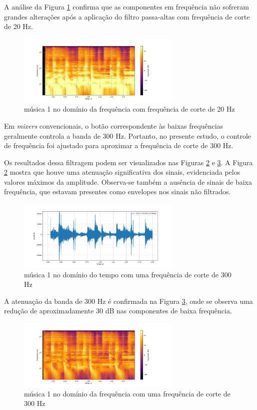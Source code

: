 A análise da Figura \ref{fig25} confirma que as componentes em frequência não sofreram grandes alterações após a aplicação do filtro passa-altas com frequência de corte de 20 Hz.

\begin{figure}[h]
    \centering
    \includegraphics[width=0.7\textwidth]{figuras/fig25.png}
    \caption{música 1 no domínio da frequência com frequência de corte de 20 Hz}
    \label{fig25}
\end{figure}


Em \textit{mixers} convencionais, o botão correspondente às baixas frequências geralmente controla a banda de 300 Hz. Portanto, no presente estudo, o controle de frequência foi ajustado para aproximar a frequência de corte de 300 Hz.

Os resultados dessa filtragem podem ser visualizados nas Figuras \ref{fig28} e \ref{fig29}. A Figura \ref{fig28} mostra que houve uma atenuação significativa dos sinais, evidenciada pelos valores máximos da amplitude. Observa-se também a ausência de sinais de baixa frequência, que estavam presentes como envelopes nos sinais não filtrados.

\begin{figure}[h]
    \centering
    \includegraphics[width=0.7\textwidth]{figuras/fig28.png}
    \caption{música 1 no domínio do tempo com uma frequência de corte de 300 Hz}
    \label{fig28}
\end{figure}

A atenuação da banda de 300 Hz é confirmada na Figura \ref{fig29}, onde se observa uma redução de aproximadamente 30 dB nas componentes de baixa frequência.

\begin{figure}[h]
    \centering
    \includegraphics[width=0.7\textwidth]{figuras/fig29.png}
    \caption{música 1 no domínio da frequência com uma frequência de corte de 300 Hz}
    \label{fig29}
\end{figure}


